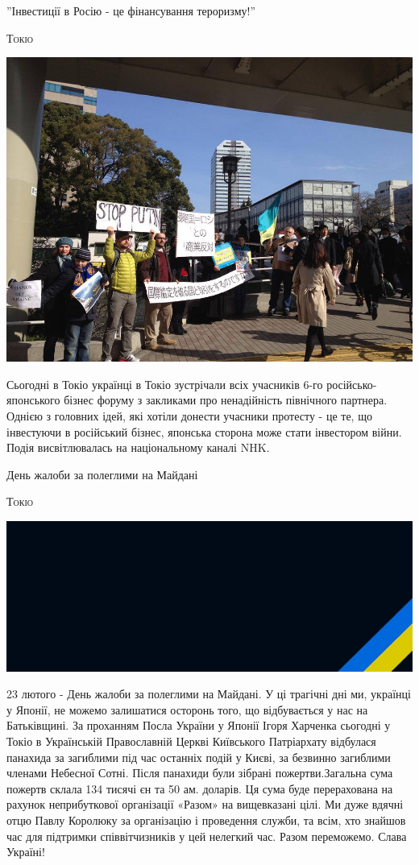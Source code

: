 \documentclass[10pt,a4paper]{article}
\newcommand{\NewsItem}[1]{%
		\usefont{T2A}{iwona}{m}{n} 
		\large #1 \vspace{4pt}
		\par \normalsize \normalfont}
\newcommand{\NewsAuthor}[1]{%
			\hfill \textsc{#1} \vspace{4pt}
			\par \normalfont}
\begin{document}
\begin{multicols}{3}
\vspace{1cm}
\NewsItem{''Інвестиції в Росію - це фінансування тероризму!''}
\NewsAuthor{Токіо}
		\begin{center}
			\includegraphics[width=0.8\linewidth]{images/business-forum}
		\end{center}
Сьогодні в Токіо українці в Токіо зустрічали всіх учасників 6-го російсько-японського бізнес форуму з закликами про ненадійність північного партнера. Однією з головних ідей, які хотіли донести учасники протесту - це те, що інвестуючи в російський бізнес, японська сторона може стати інвестором війни.
Подія висвітлювалась на національному каналі NHK.

\vspace{1cm}
\NewsItem{День жалоби за полеглими на Майдані}
\NewsAuthor{Токіо}
		\begin{center}
			\includegraphics[width=0.8\linewidth]{images/den-zhaloby}
		\end{center}
23 лютого - День жалоби за полеглими на Майдані. У ці трагічні дні ми, українці у Японії, не можемо залишатися осторонь того, що відбувається у нас на Батьківщині.
За проханням Посла України у Японії Ігоря Харченка сьогодні у Токіо в Українській Православній Церкві Київського Патріархату відбулася панахида за загиблими під час останніх подій у Києві, за безвинно загиблими членами Небесної Сотні.
Після панахиди були зібрані пожертви.Загальна сума пожертв склала 134 тисячі єн та 50 ам. доларів. Ця сума буде перерахована на рахунок неприбуткової організації «Разом» на вищевказані цілі.
Ми дуже вдячні отцю Павлу Королюку за організацію і проведення служби, та всім, хто знайшов час для підтримки співвітчизників у цей нелегкий час.
Разом переможемо. Слава Україні!


\end{multicols}
\end{document}
